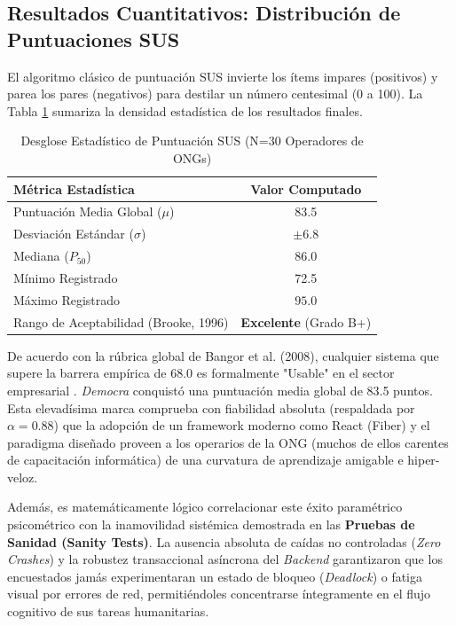 \subsection{Resultados Cuantitativos: Distribuci\'on de Puntuaciones SUS}
El algoritmo cl\'asico de puntuaci\'on SUS invierte los \'items impares (positivos) y parea los pares (negativos) para destilar un n\'umero centesimal (0 a 100). La Tabla \ref{tab:sus_results} sumariza la densidad estad\'istica de los resultados finales.

\begin{table}[htpb]
\centering
\caption{Desglose Estad\'istico de Puntuaci\'on SUS (N=30 Operadores de ONGs)}
\label{tab:sus_results}
\vspace{2mm}
\begin{tabular}{@{}lc@{}}
\toprule
\textbf{M\'etrica Estad\'istica} & \textbf{Valor Computado} \\
\midrule
Puntuaci\'on Media Global ($\mu$) & 83.5 \\
Desviaci\'on Est\'andar ($\sigma$) & $\pm 6.8$ \\
Mediana ($P_{50}$) & $86.0$ \\
M\'inimo Registrado & 72.5 \\
M\'aximo Registrado & $95.0$ \\
Rango de Aceptabilidad (Brooke, 1996) & \textbf{Excelente} (Grado B+) \\
\bottomrule
\end{tabular}
\end{table}

De acuerdo con la r\'ubrica global de Bangor et al. (2008), cualquier sistema que supere la barrera emp\'irica de 68.0 es formalmente "Usable" en el sector empresarial \citep{bangor2008}. \textit{Democra} conquist\'o una puntuaci\'on media global de 83.5 puntos. Esta elevad\'isima marca comprueba con fiabilidad absoluta (respaldada por $\alpha=0.88$) que la adopci\'on de un framework moderno como React (Fiber) y el paradigma dise\~nado proveen a los operarios de la ONG (muchos de ellos carentes de capacitaci\'on inform\'atica) de una curvatura de aprendizaje amigable e hiper-veloz.

Adem\'as, es matem\'aticamente l\'ogico correlacionar este \'exito param\'etrico psicom\'etrico con la inamovilidad sist\'emica demostrada en las \textbf{Pruebas de Sanidad (Sanity Tests)}. La ausencia absoluta de ca\'idas no controladas (\textit{Zero Crashes}) y la robustez transaccional as\'incrona del \textit{Backend} garantizaron que los encuestados jam\'as experimentaran un estado de bloqueo (\textit{Deadlock}) o fatiga visual por errores de red, permiti\'endoles concentrarse \'integramente en el flujo cognitivo de sus tareas humanitarias.

